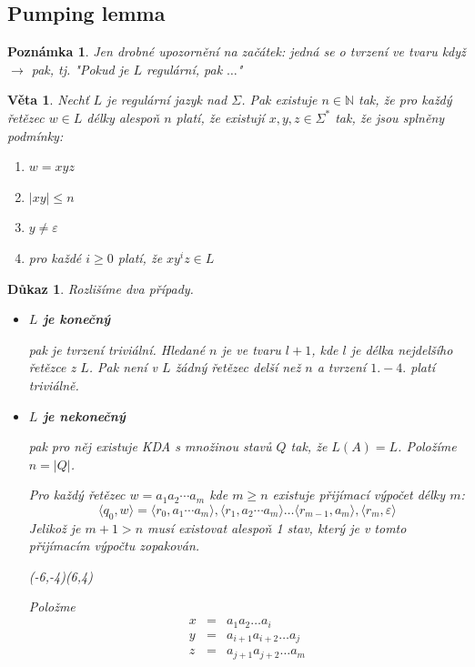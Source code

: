 \documentclass[10pt, a4paper, titlepage]{article}
\theoremstyle{note}
\newtheorem{veta}{\textbf{Věta}}
\newtheorem{dukaz}{\textbf{Důkaz}}
\newtheorem{poznamka}{\textbf{Poznámka}}
\begin{document}
\subsection{Pumping lemma}

\begin{poznamka}
Jen drobné upozornění na začátek: jedná se o tvrzení ve tvaru když $\rightarrow$ pak, tj. "Pokud je $L$ regulární, pak $\ldots$"
\end{poznamka}

\begin{veta}
Nechť $L$ je regulární jazyk nad $\Sigma$. Pak existuje $n \in \mathbb{N}$ tak, že pro každý řetězec $w \in L$ délky alespoň $n$ platí, že existují $x,y,z \in \Sigma^*$ tak, že jsou splněny podmínky:
\begin{enumerate}
\item
$w = xyz$
\item
$|xy| \le n$
\item
$y \neq \varepsilon$
\item
pro každé $i \ge 0$ platí, že $xy^iz \in L$
\end{enumerate}
\end{veta}

\begin{dukaz}
Rozlišíme dva případy.
\begin{itemize}
\item
\textbf{$L$ je konečný}
 
pak je tvrzení triviální. Hledané $n$ je ve tvaru $l+1$, kde $l$ je délka nejdelšího řetězce z $L$. Pak není v $L$ žádný řetězec delší než $n$ a tvrzení $1. - 4.$ platí triviálně.
 
\item
\textbf{$L$ je nekonečný} 

pak pro něj existuje KDA s množinou stavů $Q$ tak, že $L(A) = L$. Položíme $n=|Q|$.

Pro každý řetězec $w=a_1a_2\cdots a_m$ kde $m \ge n$ existuje přijímací výpočet
délky $m$:
$$
\langle q_0,w \rangle = \langle r_0, a_1\cdots a_m \rangle,\langle r_1, a_2\cdots a_m \rangle \ldots \langle r_{m-1}, a_m \rangle, \langle r_m, \varepsilon \rangle
$$
Jelikož je $m+1 > n$ musí existovat alespoň 1 stav, který je v tomto přijímacím výpočtu zopakován.

\begin{center}
\begin{VCPicture}{(-6,-4)(6,4)}


\end{VCPicture}
\end{center}
Položme
\begin{eqnarray*}
x &=& a_{1}a_{2}\ldots a_{i} \\
y &=& a_{i+1}a_{i+2}\ldots a_{j} \\
z &=& a_{j+1}a_{j+2}\ldots a_{m}
\end{eqnarray*}
\end{itemize}
\end{dukaz}
\end{document}
